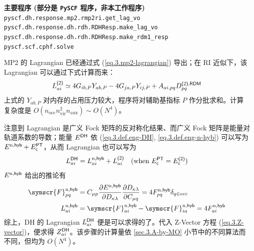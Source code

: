 \begin{tcolorbox}
    \textbf{主要程序 (部分是 \texttt{PySCF} 程序，非本工作程序)}\\
    \verb|pyscf.dh.response.mp2.rmp2ri.get_lag_vo|\\
    \verb|pyscf.dh.response.dh.rdh.RDHResp.make_lag_vo|\\
    \verb|pyscf.dh.response.dh.rdh.RDHResp.make_rdm1_resp|\\
    \verb|pyscf.scf.cphf.solve|
\end{tcolorbox}

MP2 的 Lagrangian 已经通过式 (\ref{eq.3.mp2-lagrangian}) 导出；在 RI 近似下，该 Lagrangian 可以通过下式计算而来：
\begin{equation}
    \label{eq.3.Lai-mp2-ri}
    L_{ai}^{\textsf{(2)}} \simeq 4 G_{ib, P} Y_{ab, P} - 4 G_{ja, P} Y_{ij, P} + A_{ai, pq} D_{pq}^{\textsf{(2)}, \textsf{RDM}}
\end{equation}
上式的 $Y_{ab, P}$ 对内存的占用压力较大，程序将对辅助基指标 $P$ 作分批求和。计算复杂度是 $O(n_\mathrm{occ} n_\mathrm{vir}^2 n_\mathrm{aux}) \sim O(N^4)$。

注意到 Lagrangian 是广义 Fock 矩阵的反对称化结果、而广义 Fock 矩阵是能量对轨道系数的导数；能量 $E^{\textsf{DH}}$ 依 (\ref{eq.3.def.eng-DH}, \ref{eq.3.def.eng-n-hyb}) 可以写为 $E^{\mathrm{n}, \textsf{hyb}} + E_{\textsf{c}}^{\textsf{PT}}$，从而 Lagrangian 也可以写为
\begin{equation}
    L_{ai}^{\textsf{DH}} = L_{ai}^{\mathrm{n}, \textsf{hyb}} + L_{ai}^{\textsf{(2)}} \quad (\text{when $E_{\textsf{c}}^{\textsf{PT}} = E_{\textsf{c}}^{\textsf{(2)}}$})
\end{equation}
$E^{\mathrm{n}, \textsf{hyb}}$ 给出的推论有
\begin{align}
    \symscr{F}_{pq}^{\mathrm{n}, \textmt{hyb}} &= C_{\mu p} \frac{\partial E^{\mathrm{n}, \textmt{hyb}}}{\partial D_{\kappa \lambda}} \frac{\partial D_{\kappa \lambda}}{\partial C_{\mu q}} = 4 F_{pq}^{\mathrm{n}, \textmt{hyb}} \delta_{q \in \mathrm{occ}} \\
    \label{eq.3.Lai-n-hyb}
    L_{ai}^{\mathrm{n}, \textmt{hyb}} &= \symscr{F}_{ai}^{\mathrm{n}, \textmt{hyb}} - \symscr{F}_{ia}^{\mathrm{n}, \textmt{hyb}} = 4 F_{ai}^{\mathrm{n}, \textmt{hyb}}
\end{align}
综上，DH 的 Lagrangian $L_{ai}^{\textsf{DH}}$ 便是可以求得的了。代入 Z-Vector 方程 (\ref{eq.3.Z-vector})，便求得 $Z_{ai}^{\textsf{DH}}$。该步骤的计算量依 \ref{sec.3.A-by-MO} 小节中的不同算法而不同，但均为 $O(N^4)$。

